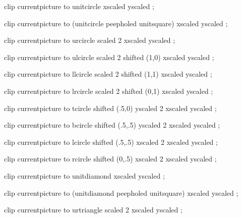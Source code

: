 

  clip currentpicture to unitcircle
    xscaled \width yscaled \height ;
\stopMPclip

  clip currentpicture to (unitcircle peepholed unitsquare)
    xscaled \width yscaled \height ;
\stopMPclip

  clip currentpicture to urcircle scaled 2
    xscaled \width yscaled \height ;
\stopMPclip

  clip currentpicture to ulcircle scaled 2 shifted (1,0)
    xscaled \width yscaled \height ;
\stopMPclip

  clip currentpicture to llcircle scaled 2 shifted (1,1)
    xscaled \width yscaled \height ;
\stopMPclip

  clip currentpicture to lrcircle scaled 2 shifted (0,1)
    xscaled \width yscaled \height ;
\stopMPclip

  clip currentpicture to tcircle shifted (.5,0) yscaled 2
    xscaled \width yscaled \height ;
\stopMPclip

  clip currentpicture to bcircle shifted (.5,.5) yscaled 2
    xscaled \width yscaled \height ;
\stopMPclip

  clip currentpicture to lcircle shifted (.5,.5) xscaled 2
    xscaled \width yscaled \height ;
\stopMPclip

  clip currentpicture to rcircle shifted (0,.5) xscaled 2
    xscaled \width yscaled \height ;
\stopMPclip

  clip currentpicture to unitdiamond
    xscaled \width yscaled \height ;
\stopMPclip

  clip currentpicture to (unitdiamond peepholed unitsquare)
    xscaled \width yscaled \height ;
\stopMPclip

  clip currentpicture to urtriangle scaled 2
    xscaled \width yscaled \height ;
\stopMPclip

